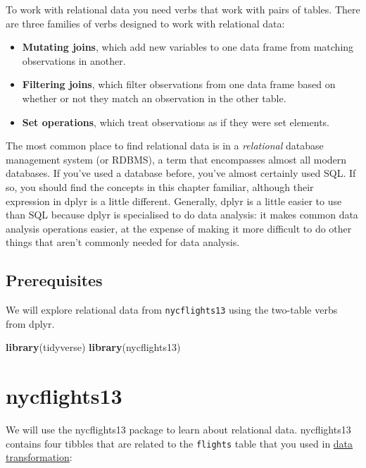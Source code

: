\documentclass[]{book}
\newenvironment{Shaded}{\begin{snugshade}}{\end{snugshade}}
\newcommand{\KeywordTok}[1]{\textcolor[rgb]{0.13,0.29,0.53}{\textbf{{#1}}}}
\newcommand{\NormalTok}[1]{{#1}}
\begin{document}
To work with relational data you need verbs that work with pairs of
tables. There are three families of verbs designed to work with
relational data:

\begin{itemize}
\item
  \textbf{Mutating joins}, which add new variables to one data frame
  from matching observations in another.
\item
  \textbf{Filtering joins}, which filter observations from one data
  frame based on whether or not they match an observation in the other
  table.
\item
  \textbf{Set operations}, which treat observations as if they were set
  elements.
\end{itemize}

The most common place to find relational data is in a \emph{relational}
database management system (or RDBMS), a term that encompasses almost
all modern databases. If you've used a database before, you've almost
certainly used SQL. If so, you should find the concepts in this chapter
familiar, although their expression in dplyr is a little different.
Generally, dplyr is a little easier to use than SQL because dplyr is
specialised to do data analysis: it makes common data analysis
operations easier, at the expense of making it more difficult to do
other things that aren't commonly needed for data analysis.

\subsection{Prerequisites}\label{prerequisites-7}

We will explore relational data from \texttt{nycflights13} using the
two-table verbs from dplyr.

\begin{Shaded}
\begin{Highlighting}[]
\KeywordTok{library}\NormalTok{(tidyverse)}
\KeywordTok{library}\NormalTok{(nycflights13)}
\end{Highlighting}
\end{Shaded}

\section{nycflights13}\label{nycflights13-relational}

We will use the nycflights13 package to learn about relational data.
nycflights13 contains four tibbles that are related to the
\texttt{flights} table that you used in
\protect\hyperlink{transform}{data transformation}:
\end{document}

